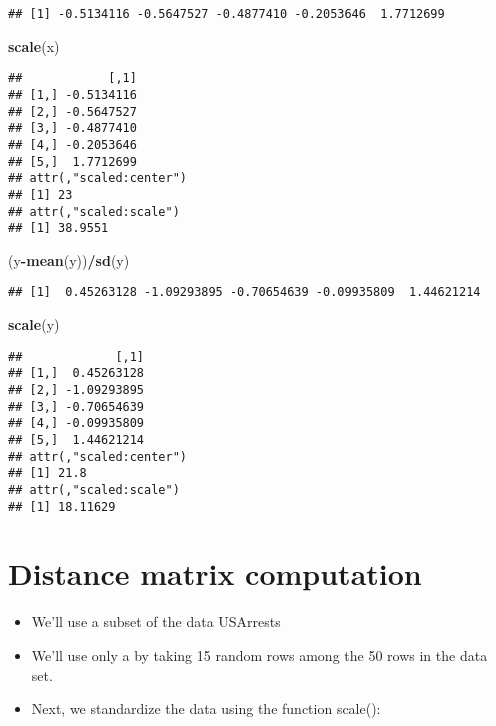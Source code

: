 \documentclass[
]{article}
\newenvironment{Shaded}{\begin{snugshade}}{\end{snugshade}}
\newcommand{\KeywordTok}[1]{\textcolor[rgb]{0.13,0.29,0.53}{\textbf{#1}}}
\newcommand{\NormalTok}[1]{#1}
\newcommand{\OperatorTok}[1]{\textcolor[rgb]{0.81,0.36,0.00}{\textbf{#1}}}
\providecommand{\tightlist}{%
  \setlength{\itemsep}{0pt}\setlength{\parskip}{0pt}}
\begin{document}
\begin{verbatim}
## [1] -0.5134116 -0.5647527 -0.4877410 -0.2053646  1.7712699
\end{verbatim}

\begin{Shaded}
\begin{Highlighting}[]
\KeywordTok{scale}\NormalTok{(x)}
\end{Highlighting}
\end{Shaded}

\begin{verbatim}
##            [,1]
## [1,] -0.5134116
## [2,] -0.5647527
## [3,] -0.4877410
## [4,] -0.2053646
## [5,]  1.7712699
## attr(,"scaled:center")
## [1] 23
## attr(,"scaled:scale")
## [1] 38.9551
\end{verbatim}

\begin{Shaded}
\begin{Highlighting}[]
\NormalTok{(y}\OperatorTok{-}\KeywordTok{mean}\NormalTok{(y))}\OperatorTok{/}\KeywordTok{sd}\NormalTok{(y)}
\end{Highlighting}
\end{Shaded}

\begin{verbatim}
## [1]  0.45263128 -1.09293895 -0.70654639 -0.09935809  1.44621214
\end{verbatim}

\begin{Shaded}
\begin{Highlighting}[]
\KeywordTok{scale}\NormalTok{(y)}
\end{Highlighting}
\end{Shaded}

\begin{verbatim}
##             [,1]
## [1,]  0.45263128
## [2,] -1.09293895
## [3,] -0.70654639
## [4,] -0.09935809
## [5,]  1.44621214
## attr(,"scaled:center")
## [1] 21.8
## attr(,"scaled:scale")
## [1] 18.11629
\end{verbatim}

\hypertarget{distance-matrix-computation}{%
\section{Distance matrix
computation}\label{distance-matrix-computation}}

\begin{itemize}
\tightlist
\item
  We'll use a subset of the data USArrests
\item
  We'll use only a by taking 15 random rows among the 50 rows in the
  data set.
\item
  Next, we standardize the data using the function scale():
\end{itemize}
\end{document}
